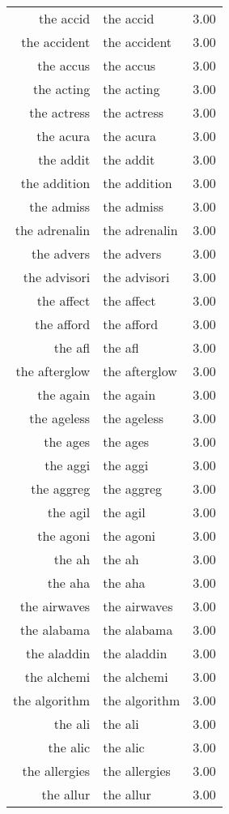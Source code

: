 \begin{table}[ht]
\begin{tabular}{rlr}
  the accid & the accid & 3.00 \\ 
  the accident & the accident & 3.00 \\ 
  the accus & the accus & 3.00 \\ 
  the acting & the acting & 3.00 \\ 
  the actress & the actress & 3.00 \\ 
  the acura & the acura & 3.00 \\ 
  the addit & the addit & 3.00 \\ 
  the addition & the addition & 3.00 \\ 
  the admiss & the admiss & 3.00 \\ 
  the adrenalin & the adrenalin & 3.00 \\ 
  the advers & the advers & 3.00 \\ 
  the advisori & the advisori & 3.00 \\ 
  the affect & the affect & 3.00 \\ 
  the afford & the afford & 3.00 \\ 
  the afl & the afl & 3.00 \\ 
  the afterglow & the afterglow & 3.00 \\ 
  the again & the again & 3.00 \\ 
  the ageless & the ageless & 3.00 \\ 
  the ages & the ages & 3.00 \\ 
  the aggi & the aggi & 3.00 \\ 
  the aggreg & the aggreg & 3.00 \\ 
  the agil & the agil & 3.00 \\ 
  the agoni & the agoni & 3.00 \\ 
  the ah & the ah & 3.00 \\ 
  the aha & the aha & 3.00 \\ 
  the airwaves & the airwaves & 3.00 \\ 
  the alabama & the alabama & 3.00 \\ 
  the aladdin & the aladdin & 3.00 \\ 
  the alchemi & the alchemi & 3.00 \\ 
  the algorithm & the algorithm & 3.00 \\ 
  the ali & the ali & 3.00 \\ 
  the alic & the alic & 3.00 \\ 
  the allergies & the allergies & 3.00 \\ 
  the allur & the allur & 3.00 \\ 

\end{tabular}
\end{table}
